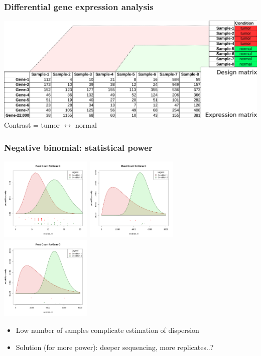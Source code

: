 \documentclass{beamer}			  %
\begin{document}
\begin{frame}
	\frametitle{Differential gene expression analysis}
	\includegraphics[width=\textwidth]{figures/dge_11bp.pdf} \\
	Contrast = tumor $\leftrightarrow$ normal
\end{frame}

\begin{frame}
	\frametitle{Negative binomial: statistical power}
	\includegraphics[width=0.33\textwidth]{figures/dge_12ap.png}
	\includegraphics[width=0.33\textwidth]{figures/dge_12bp.png}
	\includegraphics[width=0.33\textwidth]{figures/dge_12cp.png}
	
	\begin{itemize}
		\item Low number of samples complicate estimation of dispersion
		\item Solution (for more power): deeper sequencing, more replicates..?
	\end{itemize}
\end{frame}
\end{document}
